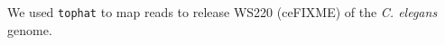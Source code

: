 



We used {\tt tophat} to map reads to release WS220 (ceFIXME) of the {\em C. elegans} genome.










